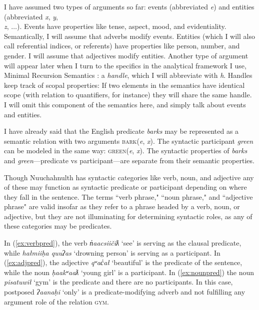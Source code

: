 I have assumed two types of arguments so far: events (abbreviated \textit{e}) and entities (abbreviated \textit{x}, \textit{y}, \\ \textit{z}, $\ldots$). Events have properties like tense, aspect, mood, and evidentiality. Semantically, I will assume that adverbs modify events. Entities (which I will also call referential indices, or referents) have properties like person, number, and gender. I will assume that adjectives modify entities. Another type of argument will appear later when I turn to the specifics in the analytical framework I use, Minimal Recursion Semantics \citep{copestake2005}: a \textit{handle}, which I will abbreviate with \textit{h}. Handles keep track of scopal properties: If two elements in the semantics have identical scope (with relation to quantifiers, for instance) they will share the same handle. I will omit this component of the semantics here, and simply talk about events and entities.

I have already said that the English predicate \textit{barks} may be represented as a semantic relation with two arguments \textsc{bark}(\textit{e}, \textit{x}). The syntactic participant \textit{green} can be modeled in the same way: \textsc{green}(\textit{e}, \textit{x}). The syntactic properties of \textit{barks} and \textit{green}---predicate vs participant---are separate from their semantic properties.

Though Nuuchahnulth has syntactic categories like verb, noun, and adjective \citep{jacobsen1979, wojdak2001, davidson2002, inmanwerle2016b} any of these may function as syntactic predicate or participant depending on where they fall in the sentence. The terms ``verb phrase," ``noun phrase," and ``adjective phrase" are valid insofar as they refer to a phrase headed by a verb, noun, or adjective, but they are not illuminating for determining syntactic roles, as any of these categories may be predicates.

In (\ref{ex:verbpred}), the verb \textit{n̓aacsiičiƛ} `see' is serving as the clausal predicate, while \textit{hałmiiḥa quuʔas} `drowning person' is serving as a participant. In (\ref{ex:adjpred}), the adjective \textit{qʷac̓ał} `beautiful' is the predicate of the sentence, while the noun \textit{ḥaakʷaaƛ} `young girl' is a participant. In (\ref{ex:nounpred}) the noun \textit{pisatuwił} `gym' is the predicate and there are no participants. In this case, postposed \textit{ʔaanaḥi} `only' is a predicate-modifying adverb and not fulfilling any argument role of the relation \textsc{gym}.


